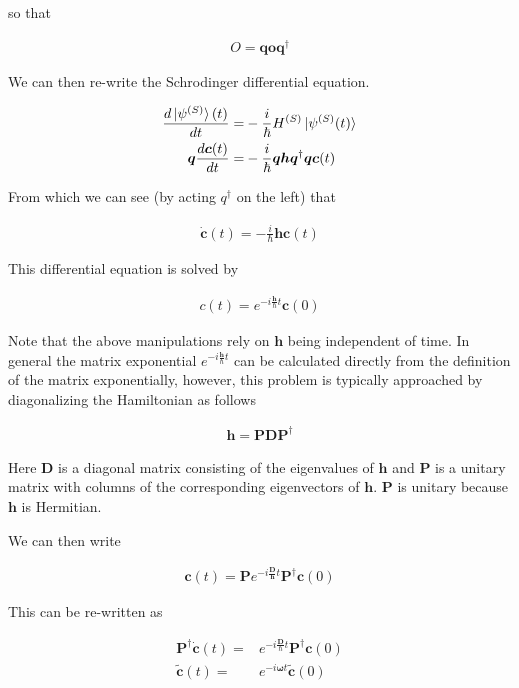 \documentclass[12pt]{article}
\newcommand{\bv}[1]{\boldsymbol{#1}}
\begin{document}
so that

\begin{align}
O = \bv{q}\bv{o}\bv{q}^{\dag}
\end{align}

We can then re-write the Schrodinger differential equation.

\begin{align}
\frac{d\ket{\psi^{(S)}}(t)}{dt} =& -\frac{i}{\hbar}H^{(S)}\ket{\psi^{(S)}(t)}\\
\bv{q}\frac{d\bv{c}(t)}{dt} =& -\frac{i}{\hbar}\bv{q}\bv{h}\bv{q}^{\dag}\bv{q}\bv{c}(t)
\end{align}

From which we can see (by acting $q^{\dag}$ on the left) that

\begin{align}
\dot{\bv{c}}(t) = -\frac{i}{\hbar}\bv{h}\bv{c}(t)
\end{align}

This differential equation is solved by

\begin{align}
c(t) = e^{-i\frac{\bv{h}}{\hbar}t}\bv{c}(0)
\end{align}

Note that the above manipulations rely on $\bv{h}$ being independent of time.
In general the matrix exponential $e^{-i\frac{\bv{h}}{\hbar}t}$ can be calculated directly from the definition of the matrix exponentially, however, this problem is typically approached by diagonalizing the Hamiltonian as follows

\begin{align}
\bv{h} = \bv{P}\bv{D}\bv{P}^{\dag}
\end{align}

Here $\bv{D}$ is a diagonal matrix consisting of the eigenvalues of $\bv{h}$ and $\bv{P}$ is a unitary matrix with columns of the corresponding eigenvectors of $\bv{h}$.
$\bv{P}$ is unitary because $\bv{h}$ is Hermitian.

We can then write

\begin{align}
\bv{c}(t) = \bv{P}e^{-i \frac{\bv{D}}{\bv{h}}t}\bv{P}^{\dag}\bv{c}(0)
\end{align}

This can be re-written as

\begin{align}
\bv{P}^{\dag}\dot{\bv{c}}(t) =& e^{-i\frac{\bv{D}}{\hbar}t}\bv{P}^{\dag}\bv{c}(0)\\
\tilde{\bv{c}}(t) =& e^{-i\bv{\omega} t}\tilde{\bv{c}}(0)
\end{align}
\end{document}
